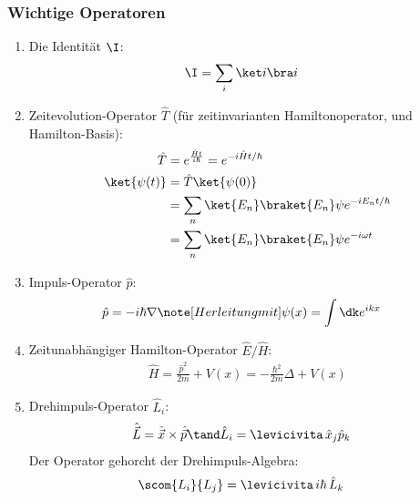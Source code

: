 \documentclass[twocolumn, unnumberedsubsub]{summery_3.1}
\begin{document}
\subsubsection{Wichtige Operatoren}
\begin{enumerate}
    \item Die Identität \(\I\):
    \begin{align*}
        \I &= \sum_i \ket i \bra i 
    \end{align*}
    
    \item Zeitevolution-Operator \(\hat T\) (für zeitinvarianten Hamiltonoperator, und Hamilton-Basis):
    \begin{align*}
        \hat T &= e^{\frac{\hat H t}{i \hbar}} = e^{-i\hat H t/\hbar}\\
        \ket{\psi(t)} &= \hat T \ket {\psi(0)}\\
        &= \sum_n \ket {E_n} \braket {{E_n}}\psi e^{-i E_n t/\hbar}\\
        &= \sum_n \ket {E_n} \braket {E_n}\psi e^{-i \omega t} 
    \end{align*}
    
    \item Impuls-Operator \(\hat p\):
    \begin{align*}
        \hat p &= -i\hbar \nabla \note[Herleitung mit ] \psi(x) = \int\dk e^{i k x}
    \end{align*}
    
    \item Zeitunabhängiger Hamilton-Operator \(\hat E/\hat H\):
    \begin{align*}
        \hat H = \frac{\hat p^2}{2m} + V(x)
        = -\frac{\hbar^2}{2m} \Delta + V(x)
    \end{align*}
    
    \item Drehimpuls-Operator \(\hat L_i\):
    \begin{align*}
        \hat {\vec L} &= \hat {\vec x} \times  \hat {\vec p} \tand
        \hat L_i = \levicivita\, \hat x_j  \hat p_k
    \end{align*}
    Der Operator gehorcht der Drehimpuls-Algebra:
    \begin{align*}
        \scom{L_i}{L_j} &= \levicivita \,i\hbar\, \hat L_k
    \end{align*}
    

\end{enumerate}
\end{document}
